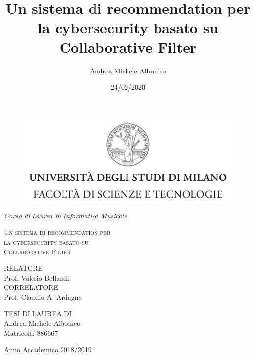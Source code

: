 \documentclass[12pt, fleqn, twoside, a4paper]{book}
\title{Un sistema di recommendation per la cybersecurity basato su Collaborative Filter}
\author{Andrea Michele Albonico}
\date{24/02/2020}
\begin{document}
\frontmatter

\begin{titlepage}
    \begin{center}
        \begin{figure}
            \centering
            \includegraphics[height=5.0 cm]{logo}
        \end{figure}
        \vspace{.2 cm}
        {\Large
            \emph{Corso di Laurea in Informatica Musicale}
        }
        \vfill
        \begin{LARGE}
            \textsc{Un sistema di recommendation per\\[-0.2 cm]
            la cybersecurity basato su\\[.2 cm]
            Collaborative Filter}
        \end{LARGE}
        \vfill
        \begin{flushleft}
            {\large
                RELATORE\\[.3 cm] Prof. Valerio Bellandi\\[1 cm]
                \noindent CORRELATORE\\[.3 cm] Prof. Claudio A. Ardagna
            }
        \end{flushleft}
        \vfill
        \begin{flushright}
            {\large TESI DI LAUREA DI\\[.3cm] Andrea Michele Albonico\\[.15cm] Matricola: 886667}
        \end{flushright}
        \vfill
        {\Large Anno Accademico 2018/2019}
    \end{center}
\end{titlepage}

\break




\end{document}
